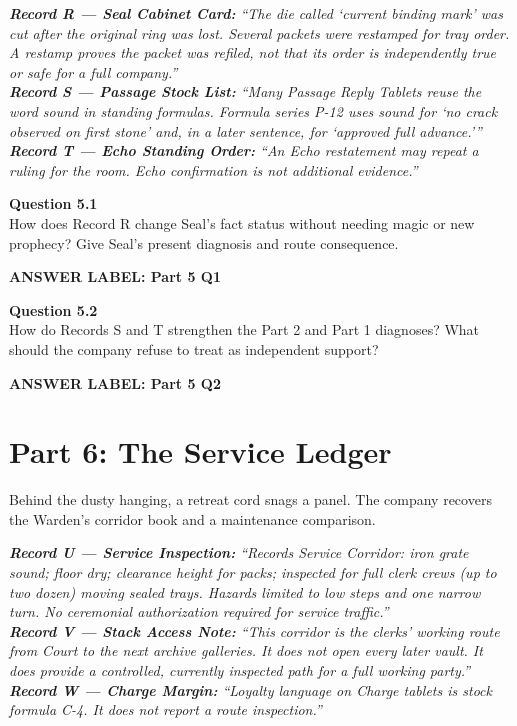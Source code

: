 \documentclass[12pt]{article}
\newcommand{\answerbox}[2]{\par\vspace{0.08em}\noindent\textbf{#1}\par\vspace{0.03em}\noindent\fbox{\begin{minipage}[t][#2]{\dimexpr\textwidth-2\fboxsep-2\fboxrule}\rule{\textwidth}{0pt}\vspace{#2}\end{minipage}}\par\vspace{0.16em}}
\newcommand{\cluebox}[1]{\par\vspace{0.12em}\noindent\begin{minipage}{\textwidth}\itshape #1\end{minipage}\par\vspace{0.12em}}
\begin{document}
\cluebox{\textbf{Record R --- Seal Cabinet Card:} ``The die called `current binding mark' was cut after the original ring was lost. Several packets were restamped for tray order. A restamp proves the packet was refiled, not that its order is independently true or safe for a full company.''\\[0.2em]
\textbf{Record S --- Passage Stock List:} ``Many Passage Reply Tablets reuse the word \emph{sound} in standing formulas. Formula series P-12 uses \emph{sound} for `no crack observed on first stone' and, in a later sentence, for `approved full advance.'''\\[0.2em]
\textbf{Record T --- Echo Standing Order:} ``An Echo restatement may repeat a ruling for the room. Echo confirmation is not additional evidence.''}

\textbf{Question 5.1}\\[-0.15em]
How does Record R change Seal's fact status without needing magic or new prophecy? Give Seal's present diagnosis and route consequence.
\answerbox{ANSWER LABEL: Part 5 Q1}{1.75in}

\textbf{Question 5.2}\\[-0.15em]
How do Records S and T strengthen the Part 2 and Part 1 diagnoses? What should the company refuse to treat as independent support?
\answerbox{ANSWER LABEL: Part 5 Q2}{1.75in}

\newpage
\section*{Part 6: The Service Ledger}
Behind the dusty hanging, a retreat cord snags a panel. The company recovers the Warden's corridor book and a maintenance comparison.

\cluebox{\textbf{Record U --- Service Inspection:} ``Records Service Corridor: iron grate sound; floor dry; clearance height for packs; inspected for full clerk crews (up to two dozen) moving sealed trays. Hazards limited to low steps and one narrow turn. No ceremonial authorization required for service traffic.''\\[0.2em]
\textbf{Record V --- Stack Access Note:} ``This corridor is the clerks' working route from Court to the next archive galleries. It does not open every later vault. It does provide a controlled, currently inspected path for a full working party.''\\[0.2em]
\textbf{Record W --- Charge Margin:} ``Loyalty language on Charge tablets is stock formula C-4. It does not report a route inspection.''}
\end{document}
